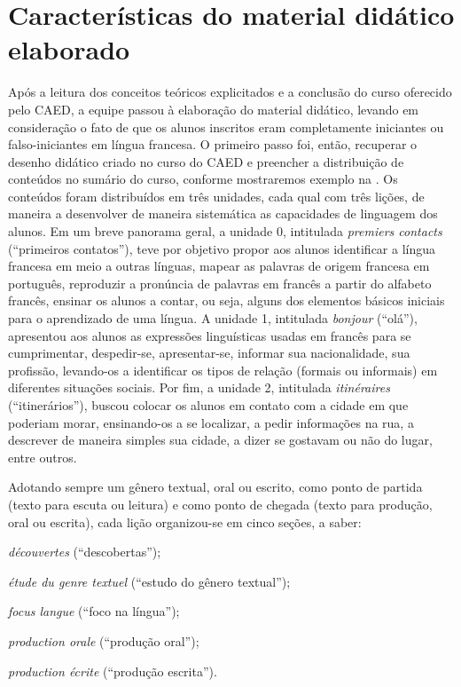 \section{Características do material didático elaborado}\label{sec-caracteristicas}

Após a leitura dos conceitos teóricos explicitados e a conclusão do
curso oferecido pelo CAED, a equipe passou à elaboração do material
didático, levando em consideração o fato de que os alunos inscritos eram
completamente iniciantes ou falso-iniciantes em língua francesa. O
primeiro passo foi, então, recuperar o desenho didático criado no curso
do CAED e preencher a distribuição de conteúdos no sumário do curso,
conforme mostraremos exemplo na . Os conteúdos foram
distribuídos em três unidades, cada qual com três lições, de maneira a
desenvolver de maneira sistemática as capacidades de linguagem dos
alunos. Em um breve panorama geral, a unidade 0, intitulada
\emph{premiers contacts} (\enquote{primeiros contatos}), teve por objetivo
propor aos alunos identificar a língua francesa em meio a outras
línguas, mapear as palavras de origem francesa em português, reproduzir
a pronúncia de palavras em francês a partir do alfabeto francês, ensinar
os alunos a contar, ou seja, alguns dos elementos básicos iniciais para
o aprendizado de uma língua. A unidade 1, intitulada \emph{bonjour}
(\enquote{olá}), apresentou aos alunos as expressões linguísticas usadas em
francês para se cumprimentar, despedir-se, apresentar-se, informar sua
nacionalidade, sua profissão, levando-os a identificar os tipos de
relação (formais ou informais) em diferentes situações sociais. Por fim,
a unidade 2, intitulada \emph{itinéraires} (\enquote{itinerários}), buscou
colocar os alunos em contato com a cidade em que poderiam morar,
ensinando-os a se localizar, a pedir informações na rua, a descrever de
maneira simples sua cidade, a dizer se gostavam ou não do lugar, entre
outros.

Adotando sempre um gênero textual, oral ou escrito, como ponto de
partida (texto para escuta ou leitura) e como ponto de chegada (texto
para produção, oral ou escrita), cada lição organizou-se em cinco
seções, a saber: \begin{enumerate*}[label=\alph*)]
	\item \emph{découvertes} (\enquote{descobertas});
	\item \emph{étude du genre textuel} (\enquote{estudo do gênero textual});
	\item \emph{focus langue} (\enquote{foco na língua});
	\item \emph{production orale} (\enquote{produção oral});
	\item \emph{production écrite} (\enquote{produção escrita}).
\end{enumerate*}

